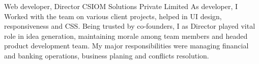     {Web developer, Director}
    {}
    {CSIOM Solutions Private Limited}
    {}
    {As developer, I Worked with the team on various client projects, helped in UI design, responsiveness and CSS. Being trusted by co-founders, I as Director played vital role in idea generation, maintaining morale among team members and headed product development team. My major responsibilities were managing financial and banking operations, business planing and conflicts resolution.
    }
    \vspace*{0.2\baselineskip}
